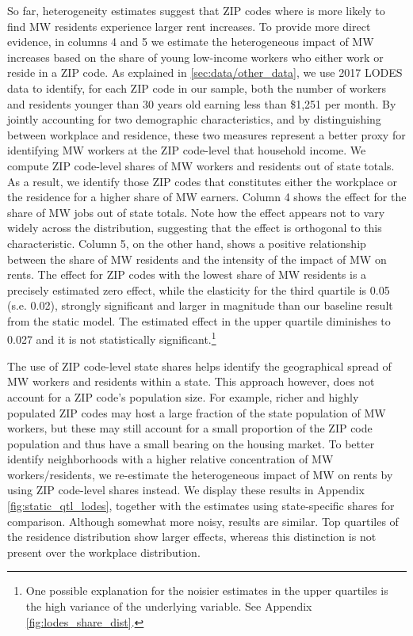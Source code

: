 So far, heterogeneity estimates suggest that ZIP codes where is more likely to find MW residents 
experience larger rent increases. To provide more direct evidence, in columns 4 and 5 we estimate 
the heterogeneous impact of MW increases based on the share of young low-income workers who 
either work or reside in a ZIP code. As explained in \autoref{sec:data/other_data}, we use 2017 
LODES data to identify, for each ZIP code in our sample, both the number of workers and residents 
younger than 30 years old earning less than \$1,251 per month.
By jointly accounting for two demographic characteristics, and by distinguishing between 
workplace and residence, these two measures represent a better proxy for identifying MW workers 
at the ZIP code-level that household income. We compute ZIP code-level shares of MW workers and 
residents out of state totals. As a result, we identify those ZIP codes that constitutes either 
the workplace or the residence for a higher share of MW earners. Column 4 shows the effect for 
the share of MW jobs out of state totals. Note how the effect appears not to vary widely across 
the distribution, suggesting that the effect is orthogonal to this characteristic. Column 5, on 
the other hand, shows a positive relationship between the share of MW residents and the intensity 
of the impact of MW on rents. The effect for ZIP codes with the lowest share of MW residents is a 
precisely estimated zero effect, while the elasticity for the third quartile is 0.05 (s.e. 0.02), 
strongly significant and larger in magnitude than our baseline result from the static model. The 
estimated effect in the upper quartile diminishes to 0.027 and it is not statistically 
significant.\footnote{\label{ft:long_tail} One possible explanation for the noisier estimates in 
	the upper quartiles is the high variance of the underlying variable. See Appendix 
	\autoref{fig:lodes_share_dist}.}

The use of ZIP code-level state shares helps identify the geographical spread of MW workers and 
residents within a state. This approach however, does not account for a ZIP code's population 
size. For example, richer and highly populated ZIP codes may host a large fraction of the state 
population of MW workers, but these may still account for a small proportion of the ZIP code 
population and thus have a small bearing on the housing market. To better identify neighborhoods 
with a higher relative concentration of MW workers/residents, we re-estimate the heterogeneous 
impact of MW on rents by using ZIP code-level shares instead. We display these results 
in Appendix \autoref{fig:static_qtl_lodes}, together with the estimates using state-specific 
shares for comparison. Although somewhat more noisy, results are similar. Top quartiles of the 
residence distribution show larger effects, whereas this distinction is not present over the 
workplace distribution.
